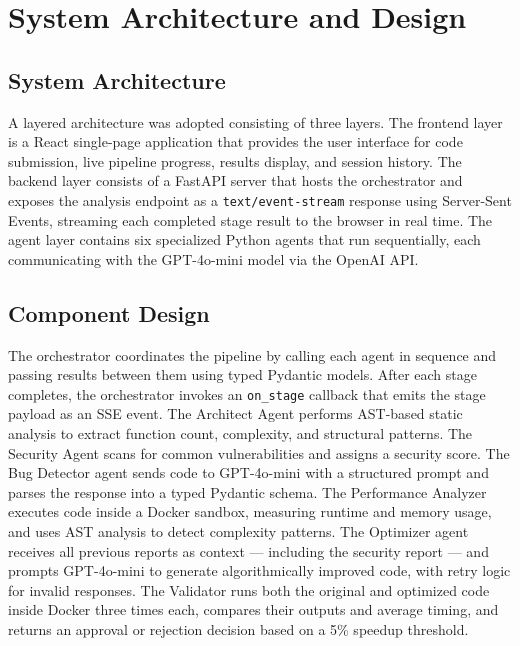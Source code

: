 \clearpage
\section{System Architecture and Design}
\label{sec:system-architecture}

\subsection{System Architecture}
A layered architecture was adopted consisting of three layers. The frontend layer is a React single-page application that provides the user interface for code submission, live pipeline progress, results display, and session history. The backend layer consists of a FastAPI server that hosts the orchestrator and exposes the analysis endpoint as a \texttt{text/event-stream} response using Server-Sent Events, streaming each completed stage result to the browser in real time. The agent layer contains six specialized Python agents that run sequentially, each communicating with the GPT-4o-mini model via the OpenAI API.

\subsection{Component Design}
The orchestrator coordinates the pipeline by calling each agent in sequence and passing results between them using typed Pydantic models. After each stage completes, the orchestrator invokes an \texttt{on\_stage} callback that emits the stage payload as an SSE event. The Architect Agent performs AST-based static analysis to extract function count, complexity, and structural patterns. The Security Agent scans for common vulnerabilities and assigns a security score. The Bug Detector agent sends code to GPT-4o-mini with a structured prompt and parses the response into a typed Pydantic schema. The Performance Analyzer executes code inside a Docker sandbox, measuring runtime and memory usage, and uses AST analysis to detect complexity patterns. The Optimizer agent receives all previous reports as context — including the security report — and prompts GPT-4o-mini to generate algorithmically improved code, with retry logic for invalid responses. The Validator runs both the original and optimized code inside Docker three times each, compares their outputs and average timing, and returns an approval or rejection decision based on a 5\% speedup threshold.

